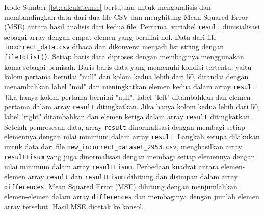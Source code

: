 \begin{enumerate}[topsep=0pt]
      

      Kode Sumber \ref{lst:calculatemse} bertujuan untuk menganalisis dan membandingkan data dari dua file CSV dan menghitung Mean Squared Error (MSE) antara hasil analisis dari kedua file. Pertama, variabel \texttt{result} diinisialisasi sebagai array dengan empat elemen yang bernilai nol. Data dari file \texttt{incorrect\_data.csv} dibaca dan dikonversi menjadi list string dengan \texttt{fileToList()}. Setiap baris data diproses dengan membaginya menggunakan koma sebagai pemisah.
      Baris-baris data yang memenuhi kondisi tertentu, yaitu kolom pertama bernilai "null" dan kolom kedua lebih dari 50, ditandai dengan menambahkan label "mid" dan meningkatkan elemen kedua dalam array \texttt{result}. Jika hanya kolom pertama bernilai "null", label "left" ditambahkan dan elemen pertama dalam array \texttt{result} ditingkatkan. Jika hanya kolom kedua lebih dari 50, label "right" ditambahkan dan elemen ketiga dalam array \texttt{result} ditingkatkan. 
      \\

      Setelah pemrosesan data, array \texttt{result} dinormalisasi dengan membagi setiap elemennya dengan nilai minimum dalam array \texttt{result}. Langkah serupa dilakukan untuk data dari file \texttt{new\_incorrect\_dataset\_2953.csv}, menghasilkan array \texttt{resultFisum} yang juga dinormalisasi dengan membagi setiap elemennya dengan nilai minimum dalam array \texttt{resultFisum}.
      Perbedaan kuadrat antara elemen-elemen array \texttt{result} dan \texttt{resultFisum} dihitung dan disimpan dalam array \texttt{differences}. Mean Squared Error (MSE) dihitung dengan menjumlahkan elemen-elemen dalam array \texttt{differences} dan membaginya dengan jumlah elemen array tersebut. Hasil MSE dicetak ke konsol.
      \\

\end{enumerate}


